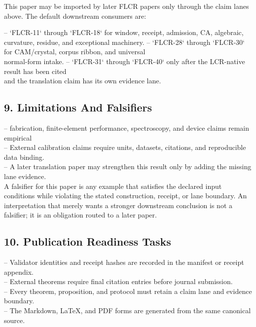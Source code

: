 \documentclass[11pt]{article}
\begin{document}
This paper may be imported by later FLCR papers only through the claim lanes
above. The default downstream consumers are:

\noindent{}-- `FLCR-11` through `FLCR-18` for window, receipt, admission, CA, algebraic,\\
  curvature, residue, and exceptional machinery.
\noindent{}-- `FLCR-28` through `FLCR-30` for CAM/crystal, corpus ribbon, and universal\\
  normal-form intake.
\noindent{}-- `FLCR-31` through `FLCR-40` only after the LCR-native result has been cited\\
  and the translation claim has its own evidence lane.

\subsection*{9. Limitations And Falsifiers}

\noindent{}-- fabrication, finite-element performance, spectroscopy, and device claims remain empirical\\
\noindent{}-- External calibration claims require units, datasets, citations, and reproducible data binding.\\
\noindent{}-- A later translation paper may strengthen this result only by adding the missing lane evidence.\\

A falsifier for this paper is any example that satisfies the declared input
conditions while violating the stated construction, receipt, or lane boundary.
An interpretation that merely wants a stronger downstream conclusion is not a
falsifier; it is an obligation routed to a later paper.

\subsection*{10. Publication Readiness Tasks}

\noindent{}-- Validator identities and receipt hashes are recorded in the manifest or receipt appendix.\\
\noindent{}-- External theorems require final citation entries before journal submission.\\
\noindent{}-- Every theorem, proposition, and protocol must retain a claim lane and evidence boundary.\\
\noindent{}-- The Markdown, LaTeX, and PDF forms are generated from the same canonical source.\\
\end{document}

